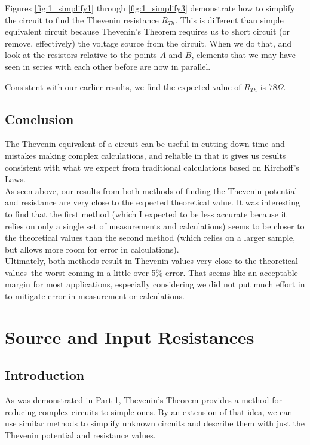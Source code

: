 \documentclass[11pt]{article}
\begin{document}
    Figures \ref{fig:1_simplify1} through \ref{fig:1_simplify3} demonstrate how to simplify the circuit to find the Thevenin resistance $R_{Th}$. This is different than simple equivalent circuit because Thevenin's Theorem requires us to short circuit (or remove, effectively) the voltage source from the circuit. When we do that, and look at the resistors relative to the points $A$ and $B$, elements that we may have seen in series with each other before are now in parallel.

    Consistent with our earlier results, we find the expected value of \(R_{Th}\) is \(78 \Omega\). \\

\subsection{Conclusion}
    The Thevenin equivalent of a circuit can be useful in cutting down time and mistakes making complex calculations, and reliable in that it gives us results consistent with what we expect from traditional calculations based on Kirchoff's Laws. \\
    
    As seen above, our results from both methods of finding the Thevenin potential and resistance are very close to the expected theoretical value. It was interesting to find that the first method (which I expected to be less accurate because it relies on only a single set of measurements and calculations) seems to be closer to the theoretical values than the second method (which relies on a larger sample, but allows more room for error in calculations). \\
    
    Ultimately, both methods result in Thevenin values very close to the theoretical values--the worst coming in a little over 5\% error. That seems like an acceptable margin for most applications, especially considering we did not put much effort in to mitigate error in measurement or calculations.\\
    

\section{Source and Input Resistances}
\subsection{Introduction}
    As was demonstrated in Part 1, Thevenin's Theorem provides a method for reducing complex circuits to simple ones. By an extension of that idea, we can use similar methods to simplify unknown circuits and describe them with just the Thevenin potential and resistance values. \\
    
\end{document}
